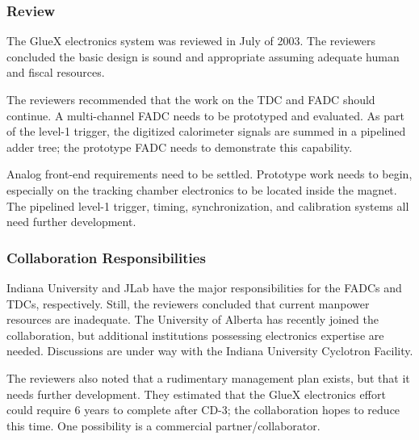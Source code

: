 \subsubsection*{Review}

The GlueX electronics system was reviewed in July of 2003.  The
reviewers concluded the basic design is sound and appropriate assuming
adequate human and fiscal resources.

The reviewers recommended that the work on the TDC and FADC should
continue.  A multi-channel FADC needs to be prototyped and evaluated.
As part of the level-1 trigger, the digitized calorimeter signals are
summed in a pipelined adder tree; the prototype FADC needs to
demonstrate this capability.

Analog front-end requirements need to be settled.  Prototype work
needs to begin, especially on the tracking chamber electronics to be
located inside the magnet.  The pipelined level-1 trigger, timing,
synchronization, and calibration systems all need further development.



\subsubsection*{Collaboration Responsibilities}

Indiana University and JLab have the major responsibilities for the
FADCs and TDCs, respectively. Still, 
the reviewers concluded that current manpower resources are
inadequate.  The University of Alberta has recently joined the
collaboration, but additional institutions possessing electronics
expertise are needed.  Discussions are under way with the Indiana University
Cyclotron Facility.

The reviewers also noted that a rudimentary management plan exists, but
that it needs further development.  
They estimated that the GlueX electronics effort could
require 6 years to complete after CD-3; the collaboration hopes to
reduce this time.  One possibility is a commercial partner/collaborator.
